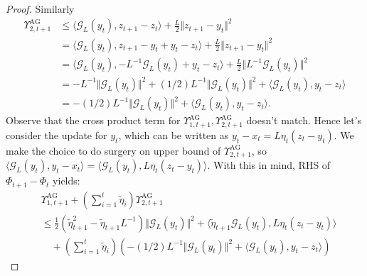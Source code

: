 \documentclass[12pt]{article}
\begin{document}
\begin{proof}
        Similarly 
        \begin{align*}
            \Upsilon_{2, t + 1}^{\text{AG}} 
            &\le 
            \langle \mathcal G_L(y_t), z_{t + 1} - z_t\rangle + 
            \frac{L}{2}\Vert z_{t + 1} - y_t\Vert^2
            \\
            &= 
            \langle \mathcal G_L(y_t), z_{t + 1} - y_t + y_t - z_t\rangle
            + \frac{L}{2}\Vert z_{t + 1} - y_t\Vert^2
            \\
            &= 
            \langle \mathcal G_L(y_t), - L^{-1} \mathcal G_L(y_t) + y_t - z_t\rangle
            + 
            \frac{L}{2}\Vert L^{-1}\mathcal G_L(y_t)\Vert^2
            \\
            &= 
            -L^{-1}\Vert \mathcal G_L(y_t)\Vert^2 
            + 
            (1/2)L^{-1}\Vert \mathcal G_L(y_t)\Vert^2 
            + 
            \langle \mathcal G_L(y_t), y_t - z_t\rangle
            \\
            &= 
            -(1/2)L^{-1}\Vert \mathcal G_L(y_t)\Vert^2
            + 
            \langle \mathcal G_L(y_t), y_t - z_t\rangle. 
        \end{align*}
        Observe that the cross product term for $\Upsilon_{1, t + 1}^\text{AG}, \Upsilon_{2, t + 1}^\text{AG}$ doesn't match. 
        Hence let's consider the update for $y_t$, which can be written as $y_t - x_t = L \eta_t (z_t - y_t)$. We make the choice to do surgery on upper bound of $\Upsilon_{2, t + 1}^\text{AG}$, so $\langle \mathcal G_L(y_t), y_t - x_t\rangle = \langle \mathcal G_L(y_t), L \eta_t (z_t - y_t)\rangle$. 
        With this in mind, RHS of $\Phi_{t + 1} - \Phi_t$ yields: 
        {\footnotesize
        \begin{align*}
            &\Upsilon_{1, t + 1}^\text{AG} + 
            \left(
                \sum_{i = 1}^{t}\tilde\eta_i 
            \right)\Upsilon_{2, t + 1}^{\text{AG}}
            \\
            &\le 
            \frac{1}{2}\left(
                \tilde\eta_{t + 1}^2 - \tilde\eta_{t + 1}L^{-1}
            \right)\Vert \mathcal G_L(y_t)\Vert^2 
            + 
            \langle \tilde\eta_{t + 1} \mathcal G_L(y_t), L\eta_t(z_t - y_t)\rangle
            \\ 
            &\quad 
            + 
            \left(
                \sum_{i = 1}^{t}\tilde\eta_i 
            \right)\left(
                -(1/2)L^{-1}\Vert \mathcal G_L(y_t)\Vert^2
                + 
                \langle \mathcal G_L(y_t), y_t - z_t\rangle
            \right)

\end{align*}}
\end{proof}
\end{document}
